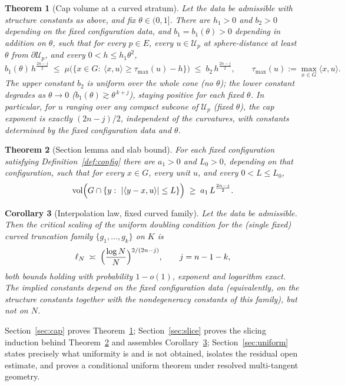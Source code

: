 \documentclass[11pt]{article}
\newtheorem{theorem}{Theorem}[section]
\newtheorem{corollary}[theorem]{Corollary}
\newcommand{\vol}{\operatorname{vol}}
\begin{document}
\begin{theorem}[Cap volume at a curved stratum]\label{thm:cap}
Let the data be admissible with structure constants as above, and fix
$\theta\in(0,1]$.  There are $h_1>0$ and $b_2>0$ depending on the fixed
configuration data, and $b_1=b_1(\theta)>0$ depending in addition on $\theta$,
such that for every $p\in E$, every $u\in\mathcal U_p$ at sphere-distance at
least $\theta$ from $\partial\mathcal U_p$, and every $0<h\le h_1\theta^2$,
\[
b_1(\theta)\,h^{\frac{2n-j}2}\;\le\;
\mu\bigl(\{x\in G:\ \langle x,u\rangle\ge\tau_{\max}(u)-h\}\bigr)
\;\le\;b_2\,h^{\frac{2n-j}2},
\qquad\tau_{\max}(u):=\max_{x\in G}\langle x,u\rangle .
\]
The upper constant $b_2$ is uniform over the whole cone (no $\theta$); the lower
constant degrades as $\theta\to0$ ($b_1(\theta)\gtrsim\theta^{\,k+j}$), staying
positive for each fixed $\theta$.  In particular, for $u$ ranging over any
compact subcone of $\mathcal U_p$ (fixed $\theta$), the cap exponent is exactly
$(2n-j)/2$, independent of the curvatures, with constants determined by the
fixed configuration data and $\theta$.
\end{theorem}

\begin{theorem}[Section lemma and slab bound]\label{thm:slab}
For each fixed configuration satisfying Definition~\ref{def:config} there are $a_1>0$ and
$L_0>0$, depending on that configuration, such that for
every $x\in G$, every unit $u$, and every $0<L\le L_0$,
\[
\vol\Bigl(G\cap\{y:\ |\langle y-x,u\rangle|\le L\}\Bigr)\;\ge\;a_1\,L^{\frac{2n-j}2}.
\]
\end{theorem}

\begin{corollary}[Interpolation law, fixed curved family]\label{cor:law}
Let the data be admissible.  Then the critical scaling of the uniform doubling
condition for the (single fixed) curved truncation family
$\{g_1,\dots,g_k\}$ on $K$ is
\[
\ell_N\;\asymp\;\Bigl(\frac{\log N}{N}\Bigr)^{2/(2n-j)},
\qquad j=n-1-k,
\]
both bounds holding with probability $1-o(1)$, exponent and logarithm exact.
The implied constants depend on the fixed configuration data (equivalently, on
the structure constants together with the nondegeneracy constants of this
family), but not on $N$.
\end{corollary}

Section~\ref{sec:cap} proves Theorem~\ref{thm:cap}; Section~\ref{sec:slice}
proves the slicing induction behind Theorem~\ref{thm:slab} and assembles
Corollary~\ref{cor:law}; Section~\ref{sec:uniform} states precisely what
uniformity is and is not obtained, isolates the residual open estimate, and
proves a conditional uniform theorem under resolved multi-tangent geometry.
\end{document}
